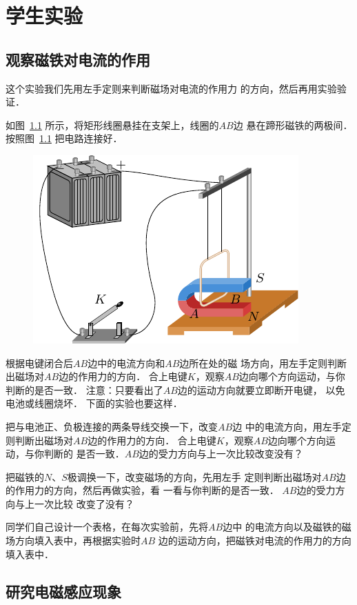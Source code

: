 \chapter{学生实验}

\section{观察磁铁对电流的作用}

这个实验我们先用左手定则来判断磁场对电流的作用力
的方向，然后再用实验验证．

如图~\ref{fig_C_10-1} 所示，将矩形线圈悬挂在支架上，线圈的$AB$边
悬在蹄形磁铁的两极间．按照图~\ref{fig_C_10-1} 把电路连接好．
\begin{figure}[htbp]
    \centering
    \includegraphics{fig/C/10-1.pdf}
    \caption{}\label{fig_C_10-1}
\end{figure}

根据电键闭合后$AB$边中的电流方向和$AB$边所在处的磁
场方向，用左手定则判断出磁场对$AB$边的作用力的方向．
合上电键$K$，观察$AB$边向哪个方向运动，与你判断的是否一致．
注意：只要看出了$AB$边的运动方向就要立即断开电键，
以免电池或线圈烧坏．
下面的实验也要这样．

把与电池正、负极连接的两条导线交换一下，改变$AB$边
中的电流方向，用左手定则判断出磁场对$AB$边的作用力的方向．
合上电键$K$，观察$AB$边向哪个方向运动，与你判断的
是否一致．$AB$边的受力方向与上一次比较改变没有？

把磁铁的$N$、$S$极调换一下，改变磁场的方向，先用左手
定则判断出磁场对$AB$边的作用力的方向，然后再做实验，看
一看与你判断的是否一致．
$AB$边的受力方向与上一次比较
改变了没有？

同学们自己设计一个表格，在每次实验前，先将$AB$边中
的电流方向以及磁铁的磁场方向填入表中，再根据实验时$AB$
边的运动方向，把磁铁对电流的作用力的方向填入表中．

\section{研究电磁感应现象}

